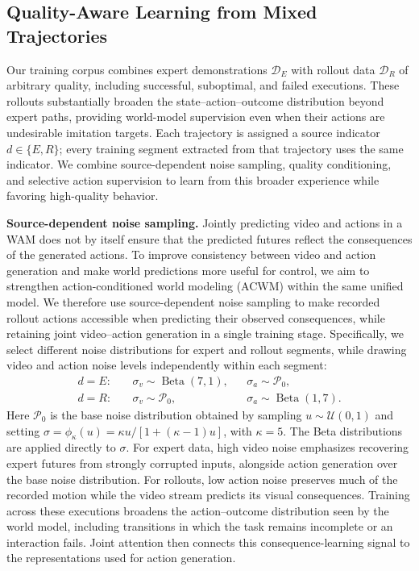 \subsection{Quality-Aware Learning from Mixed Trajectories}
\label{sec:quality_steering}

Our training corpus combines expert demonstrations $\mathcal D_E$ with rollout data $\mathcal D_R$ of arbitrary quality, including successful, suboptimal, and failed executions.
These rollouts substantially broaden the state--action--outcome distribution beyond expert paths, providing world-model supervision even when their actions are undesirable imitation targets.
Each trajectory is assigned a source indicator $d\in\{E,R\}$; every training segment extracted from that trajectory uses the same indicator.
We combine source-dependent noise sampling, quality conditioning, and selective action supervision to learn from this broader experience while favoring high-quality behavior.

\textbf{Source-dependent noise sampling.}
\label{sec:noise_sampling}
Jointly predicting video and actions in a WAM does not by itself ensure that the predicted futures reflect the consequences of the generated actions.
To improve consistency between video and action generation and make world predictions more useful for control, we aim to strengthen action-conditioned world modeling (ACWM) within the same unified model.
We therefore use source-dependent noise sampling to make recorded rollout actions accessible when predicting their observed consequences, while retaining joint video--action generation in a single training stage.
Specifically, we select different noise distributions for expert and rollout segments, while drawing video and action noise levels independently within each segment:
\begin{equation}
\begin{aligned}
    d=E:&\quad \sigma_v\sim\operatorname{Beta}(7,1),
                 &&\sigma_a\sim\mathcal P_0,\\
    d=R:&\quad \sigma_v\sim\mathcal P_0,
                 &&\sigma_a\sim\operatorname{Beta}(1,7).
\end{aligned}
\label{eq:source_noise}
\end{equation}
Here $\mathcal P_0$ is the base noise distribution obtained by sampling $u\sim\mathcal U(0,1)$ and setting $\sigma=\phi_\kappa(u)=\kappa u/[1+(\kappa-1)u]$, with $\kappa=5$.
The Beta distributions~\citep{johnson1995continuous} are applied directly to $\sigma$.
For expert data, high video noise emphasizes recovering expert futures from strongly corrupted inputs, alongside action generation over the base noise distribution.
For rollouts, low action noise preserves much of the recorded motion while the video stream predicts its visual consequences.
Training across these executions broadens the action--outcome distribution seen by the world model, including transitions in which the task remains incomplete or an interaction fails.
Joint attention then connects this consequence-learning signal to the representations used for action generation.

